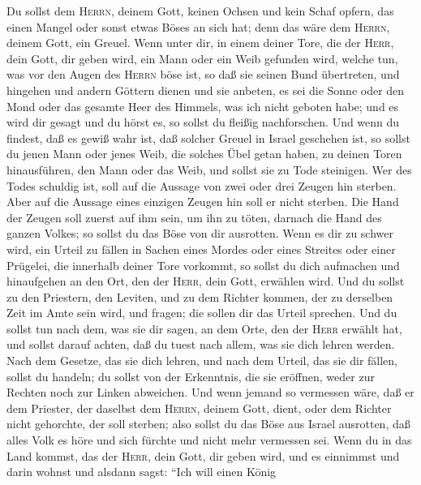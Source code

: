  Du sollst dem \textsc{Herrn}, deinem Gott, keinen Ochsen
und kein Schaf opfern, das einen Mangel oder sonst etwas Böses an sich
hat; denn das wäre dem \textsc{Herrn}, deinem Gott, ein Greuel.
 Wenn unter dir, in einem deiner Tore, die der
\textsc{Herr}, dein Gott, dir geben wird, ein Mann oder ein Weib
gefunden wird, welche tun, was vor den Augen des \textsc{Herrn} böse
ist, so daß sie seinen Bund übertreten,  und hingehen und
andern Göttern dienen und sie anbeten, es sei die Sonne oder den Mond
oder das gesamte Heer des Himmels, was ich nicht geboten habe;
 und es wird dir gesagt und du hörst es, so sollst du
fleißig nachforschen. Und wenn du findest, daß es gewiß wahr ist, daß
solcher Greuel in Israel geschehen ist,  so sollst du
jenen Mann oder jenes Weib, die solches Übel getan haben, zu deinen
Toren hinausführen, den Mann oder das Weib, und sollst sie zu Tode
steinigen.  Wer des Todes schuldig ist, soll auf die
Aussage von zwei oder drei Zeugen hin sterben. Aber auf die Aussage
eines einzigen Zeugen hin soll er nicht sterben.  Die Hand
der Zeugen soll zuerst auf ihm sein, um ihn zu töten, darnach die Hand
des ganzen Volkes; so sollst du das Böse von dir ausrotten.
 Wenn es dir zu schwer wird, ein Urteil zu fällen in
Sachen eines Mordes oder eines Streites oder einer Prügelei, die
innerhalb deiner Tore vorkommt, so sollst du dich aufmachen und
hinaufgehen an den Ort, den der \textsc{Herr}, dein Gott, erwählen wird.
 Und du sollst zu den Priestern, den Leviten, und zu dem
Richter kommen, der zu derselben Zeit im Amte sein wird, und fragen; die
sollen dir das Urteil sprechen.  Und du sollst tun nach
dem, was sie dir sagen, an dem Orte, den der \textsc{Herr} erwählt hat,
und sollst darauf achten, daß du tuest nach allem, was sie dich lehren
werden.  Nach dem Gesetze, das sie dich lehren, und nach
dem Urteil, das sie dir fällen, sollst du handeln; du sollst von der
Erkenntnis, die sie eröffnen, weder zur Rechten noch zur Linken
abweichen.  Und wenn jemand so vermessen wäre, daß er dem
Priester, der daselbst dem \textsc{Herrn}, deinem Gott, dient, oder dem
Richter nicht gehorchte, der soll sterben; also sollst du das Böse aus
Israel ausrotten,  daß alles Volk es höre und sich
fürchte und nicht mehr vermessen sei.  Wenn du in das
Land kommst, das der \textsc{Herr}, dein Gott, dir geben wird, und es
einnimmst und darin wohnst und alsdann sagst: ``Ich will einen König
